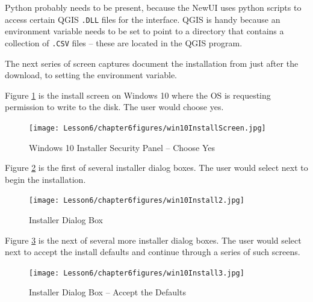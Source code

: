 Python probably needs to be present, because the NewUI uses python scripts to access certain QGIS \texttt{.DLL} files for the interface.
QGIS is handy because an environment variable needs to be set to point to a directory that contains a collection of \texttt{.CSV} files -- these are located in the QGIS program.

The next series of screen captures document the installation from just after the download, to setting the environment variable.

Figure \ref{fig:win10InstallScreen} is the install screen on Windows 10 where the OS is requesting permission to write to the disk.  The user would choose yes.

\begin{figure}[htbp] %
   \centering
   \texttt{[image: Lesson6/chapter6figures/win10InstallScreen.jpg]} 
   \caption{Windows 10 Installer Security Panel -- Choose Yes}
   \label{fig:win10InstallScreen}
\end{figure}
\clearpage

Figure \ref{fig:win10Install2} is the first of several installer dialog boxes.  The user would select next to begin the installation.

\begin{figure}[h!] %
   \centering
   \texttt{[image: Lesson6/chapter6figures/win10Install2.jpg]} 
   \caption{Installer Dialog Box}
   \label{fig:win10Install2}
\end{figure}

Figure \ref{fig:win10Install3} is the next of several more installer dialog boxes.  The user would select next to accept the install defaults and continue through a series of such screens.

\begin{figure}[h!] %
   \centering
   \texttt{[image: Lesson6/chapter6figures/win10Install3.jpg]} 
   \caption{Installer Dialog Box -- Accept the Defaults}
   \label{fig:win10Install3}
\end{figure}

\clearpage

